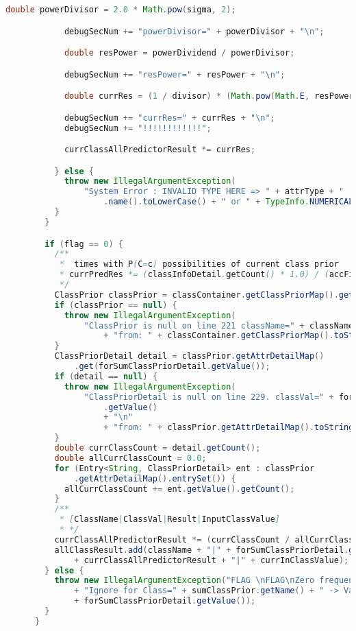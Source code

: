 \begin{lstlisting}[language=Java,basicstyle=\tiny,caption=TestingMapper.java]
            double powerDivisor = 2.0 * Math.pow(sigma, 2);

            debugSecNum += "powerDivisor=" + powerDivisor + "\n";

            double resPower = powerDividend / powerDivisor;

            debugSecNum += "resPower=" + resPower + "\n";

            double currRes = (1 / divisor) * (Math.pow(Math.E, resPower));

            debugSecNum += "currRes=" + currRes + "\n";
            debugSecNum += "!!!!!!!!!!!!";

            currClassAllPredictorResult *= currRes;

          } else {
            throw new IllegalArgumentException(
                "System Error : INVALID TYPE HERE => " + attrType + " != " + TypeInfo.DISCRETE
                    .name().toLowerCase() + " or " + TypeInfo.NUMERICAL.name().toLowerCase());
          }
        }

        if (flag == 0) {
          /**
           *  times with P(C=c) possibilities of current class prior
           * currPredRes *= (classInfoDetail.getCount() * 1.0) / (accFinal * 1.0);
           */
          ClassPrior classPrior = classContainer.getClassPriorMap().get(className);
          if (classPrior == null) {
            throw new IllegalArgumentException(
                "ClassPrior is null on line 221 className=" + className + "\n"
                    + "from: " + classContainer.getClassPriorMap().toString());
          }
          ClassPriorDetail detail = classPrior.getAttrDetailMap()
              .get(forSumClassPriorDetail.getValue());
          if (detail == null) {
            throw new IllegalArgumentException(
                "ClassPriorDetail is null on line 229. classVal=" + forSumClassPriorDetail
                    .getValue()
                    + "\n"
                    + "from: " + classPrior.getAttrDetailMap().toString());
          }
          double currClassCount = detail.getCount();
          double allCurrClassCount = 0.0;
          for (Entry<String, ClassPriorDetail> ent : classPrior
              .getAttrDetailMap().entrySet()) {
            allCurrClassCount += ent.getValue().getCount();
          }
          /**
           * [ClassName|ClassVal|Result|InputClassValue]
           * */
          currClassAllPredictorResult *= (currClassCount / allCurrClassCount);
          allClassResult.add(className + "|" + forSumClassPriorDetail.getValue() + "|"
              + currClassAllPredictorResult + "|" + currInClassValue);
        } else {
          throw new IllegalArgumentException("FLAG \nFLAG\nZero frequency problem occured.\n"
              + "Ignore for Class=" + sumClassPrior.getName() + " -> Value="
              + forSumClassPriorDetail.getValue());
        }
      }


\end{lstlisting}
